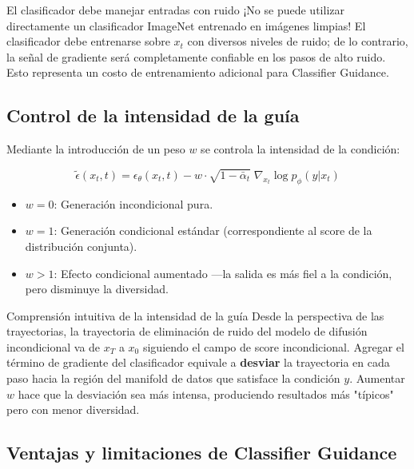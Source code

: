 \begin{warningbox}{El clasificador debe manejar entradas con ruido}
¡No se puede utilizar directamente un clasificador ImageNet entrenado en imágenes limpias! El clasificador debe entrenarse sobre $x_t$ con diversos niveles de ruido; de lo contrario, la señal de gradiente será completamente confiable en los pasos de alto ruido. Esto representa un costo de entrenamiento adicional para Classifier Guidance.
\end{warningbox}

\subsection{Control de la intensidad de la guía}

Mediante la introducción de un peso $w$ se controla la intensidad de la condición:

$$
\tilde{\epsilon}(x_t, t) = \epsilon_\theta(x_t, t) - w\cdot\sqrt{1-\bar\alpha_t}\;\nabla_{x_t}\log p_\phi(y|x_t)
$$

\begin{itemize}
    \item $w = 0$: Generación incondicional pura.
    \item $w = 1$: Generación condicional estándar (correspondiente al score de la distribución conjunta).
    \item $w > 1$: Efecto condicional aumentado —la salida es más fiel a la condición, pero disminuye la diversidad.
\end{itemize}

\begin{knowledgebox}{Comprensión intuitiva de la intensidad de la guía}
Desde la perspectiva de las trayectorias, la trayectoria de eliminación de ruido del modelo de difusión incondicional va de $x_T$ a $x_0$ siguiendo el campo de score incondicional. Agregar el término de gradiente del clasificador equivale a \textbf{desviar} la trayectoria en cada paso hacia la región del manifold de datos que satisface la condición $y$. Aumentar $w$ hace que la desviación sea más intensa, produciendo resultados más "típicos" pero con menor diversidad.
\end{knowledgebox}

\subsection{Ventajas y limitaciones de Classifier Guidance}

